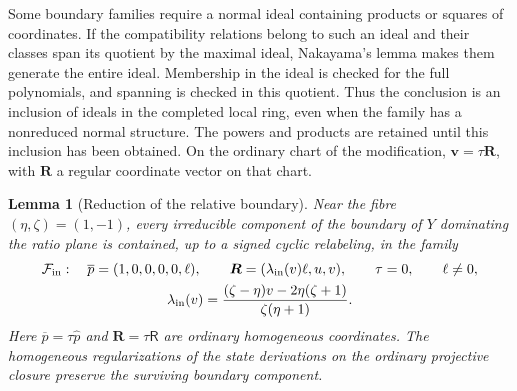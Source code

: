 \documentclass[11pt,a4paper]{article}
\numberwithin{equation}{section}
\theoremstyle{plain}
\newtheorem{lemma}[theorem]{Lemma}
\theoremstyle{definition}
\theoremstyle{remark}
\begin{document}
Some boundary families require a normal ideal containing products
or squares of coordinates. If the compatibility relations belong to such an
ideal and their classes span its quotient by the maximal ideal,
Nakayama's lemma makes them generate the entire ideal. Membership
in the ideal is checked for the full polynomials, and spanning is
checked in this quotient. Thus the conclusion is an inclusion of
ideals in the completed local ring, even when the family has a
nonreduced normal structure. The powers and products are retained
until this inclusion has been obtained.
On the ordinary chart of the modification,
$\boldsymbol v=\tau\boldsymbol R$, with $\boldsymbol R$ a regular
coordinate vector on that chart.

\begin{lemma}[Reduction of the relative boundary]\label{r3:boundaryreduction}
Near the fibre $(\eta,\zeta)=(1,-1)$, every irreducible component
of the boundary of $Y$ dominating the ratio plane is contained,
up to a signed cyclic relabeling, in the family
\begin{equation}\label{r3:incomingfamily}
\begin{gathered}
 \mathcal F_{\rm in}:\quad
 \overline p=(1,0,0,0,0,\ell),\qquad
 \boldsymbol R=(\lambda_{\mathrm{in}}(v)\ell,u,v),\qquad
 \tau=0,\qquad \ell\ne0,\\
 \lambda_{\mathrm{in}}(v)=
 \frac{(\zeta-\eta)v-2\eta(\zeta+1)}{\zeta(\eta+1)}.
\end{gathered}
\end{equation}
Here $\overline p=\tau\widehat p$ and
$\boldsymbol R=\tau\mathsf R$ are ordinary homogeneous coordinates.
The homogeneous regularizations of the state derivations on the
ordinary projective closure preserve the surviving boundary component.
\end{lemma}
\end{document}
